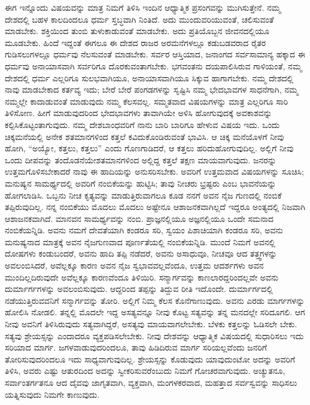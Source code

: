 ಈಗ ಇನ್ನೊಂದು ವಿಷಯವನ್ನು ಮಾತ್ರ ನಿಮಗೆ ತಿಳಿಸಿ ಇಂದಿನ ಆಧ್ಯಾತ್ಮಿಕ ಪ್ರಸಂಗವನ್ನು ಮುಗಿಸುತ್ತೇನೆ. ನಮ್ಮ ದೇಶದಲ್ಲಿ ಬಹಳ ಕಾಲದಿಂದಲೂ ಧರ್ಮ ಸ್ತಬ್ಧವಾಗಿ ನಿಂತಿದೆ. ಅದು ಮುಂದುವರಿಯುವಂತೆ, ಚಲಿಸುವಂತೆ ಮಾಡಬೇಕು. ಶಕ್ತಿಯಿಂದ ತುಂಬಿ ತುಳುಕಾಡುವಂತೆ ಮಾಡಬೇಕು. ಅದು ಪ್ರತಿಯೊಬ್ಬನ ಜೀವನದಲ್ಲಿಯೂ ಮೂಡಬೇಕು. ಹಿಂದೆ ಇದ್ದಂತೆ ಈಗಲೂ ಈ ದೇಶದ ರಾಜರ ಅರಮನೆಗಳಲ್ಲೂ ಕಡುಬಡವರಾದ ರೈತರ ಗುಡಿಸಲುಗಳಲ್ಲೂ ಧರ್ಮವು ನೆಲಸುವಂತೆ ಮಾಡಬೇಕು. ಸರ್ವರ ಆಸ್ತಿಯಾದ, ಜನಾಂಗದ ಸರ್ವಸಾಮಾನ್ಯ ಹಕ್ಕಾದ ಈ ಧರ್ಮವು ಅನಾಯಾಸವಾಗಿ ಸರ್ವರಿಗೂ ದೊರಕುವಂತಾಗಬೇಕು. ಭಗವಂತನು ದಯಪಾಲಿಸಿರುವ ಗಾಳಿಯಂತೆ, ನಮ್ಮ ದೇಶದಲ್ಲಿ ಧರ್ಮ ಎಲ್ಲರಿಗೂ ಸುಲಭವಾಗಿಯೂ, ಅನಾಯಾಸವಾಗಿಯೂ ಸಿಕ್ಕುವ ಹಾಗಾಗಬೇಕು. ನಮ್ಮ ದೇಶದಲ್ಲಿ ನಾವು ಮಾಡಬೇಕಾದ ಕರ್ತವ್ಯ ಇದು; ಬೇರೆ ಬೇರೆ ಪಂಗಡಗಳನ್ನು ಸೃಷ್ಟಿಸಿ ನಮ್ಮ ಭೇದಭಾವಗಳ ಸಾಧನೆಗಾಗಿ, ನಮ್ಮ ನಮ್ಮಲ್ಲೇ ಕಾದಾಡುವಂತೆ ಮಾಡುವುದು ನಮ್ಮ ಕೆಲಸವಲ್ಲ. ಸಮ್ಮತವಾದ ವಿಷಯಗಳನ್ನು ಮಾತ್ರ ಎಲ್ಲರಿಗೂ ಸಾರಿ ತಿಳಿಸೋಣ. ಹೀಗೆ ಮಾಡುವುದರಿಂದ ಭೇದಭಾವಗಳು ತಾವಾಗಿಯೇ ಅಳಿಸಿ ಹೋಗುವುದಕ್ಕೆ ಅವಕಾಶವನ್ನು ಕಲ್ಪಿಸಿಕೊಟ್ಟಂತಾಗುವುದು. ನಮ್ಮ ದೇಶಬಾಂಧವರಿಗೆ ನಾನು ಬಾರಿ ಬಾರಿಗೂ ಹೇಳುವ ವಿಷಯ ಇದು. ಒಂದು ಚಿಕ್ಕಮನೆಯಲ್ಲಿ ಅನೇಕ ಶತಮಾನಗಳಿಂದ ಕತ್ತಲೆ ಕವಿದುಕೊಂಡಿರುವಂತೆ ಭಾವಿಸಿ. ಆ ಚಿಕ್ಕ ಮನೆಯೊಳಗೆ ನೀವು ಹೋಗಿ, “ಅಯ್ಯೋ, ಕತ್ತಲು, ಕತ್ತಲು” ಎಂದು ಗೊಣಗಾಡಿದರೆ, ಆ ಕತ್ತಲು ಹರಿದುಹೋಗುವುದಿಲ್ಲ. ಅಲ್ಲಿಗೆ ನೀವು ಒಂದು ದೀಪವನ್ನು ತಂದೊಡನೆಯೇ\break ಶತಮಾನಗಳಿಂದ ಅಲ್ಲಿದ್ದ ಕತ್ತಲೆ ತಕ್ಷಣ ಮಾಯವಾಗುವುದು. ಜನರನ್ನು ಉತ್ತಮಗೊಳಿಸಬೇಕಾದರೆ ನಾವು ಈ ಹಾದಿಯನ್ನು ಅನುಸರಿಸಬೇಕು. ಅವರಿಗೆ ಉತ್ತಮವಾದ ವಿಷಯಗಳನ್ನು ಸೂಚಿಸಿ; ಮನುಷ್ಯನ ಸಾಮರ್ಥ್ಯದಲ್ಲಿ ಅವರಿಗೆ ನಂಬಿಕೆಯನ್ನು ಹುಟ್ಟಿಸಿ; ತಾವು ನೀಚರು ಭ್ರಷ್ಟರು ಎಂಬ ಭಾವನೆಯನ್ನು ಹೋಗಲಾಡಿಸಿ. ಒಬ್ಬನು ನೀಚ ಕೃತ್ಯವನ್ನು ಮಾಡುತ್ತಿರುವಾಗಲೂ ಕೂಡ ನನಗೆ ಅವನ ನೈಜ ಗುಣದಲ್ಲಿ ನಂಬಿಕೆ ತಪ್ಪಿರುವುದಿಲ್ಲ. ನನ್ನ ನಂಬಿಕೆಯು ಮೊದಲು ಮೊದಲು ಅಷ್ಟೇನೂ ಆಶಾಜನಕವಾಗಿಲ್ಲದೆ ಇದ್ದರೂ ಅಂತ್ಯದಲ್ಲಿ ನಿಜವಾಗಿ ಆಶಾಜನಕವಾಗಿದೆ. ಮಾನವನ ಸಾಮರ್ಥ್ಯವನ್ನು ನಂಬಿ. ಪ್ರಾಜ್ಞನಲ್ಲಿಯೂ ಅಜ್ಞನಲ್ಲಿಯೂ ಒಂದೇ ಸಮನಾದ ನಂಬಿಕೆಯನ್ನಿಡಿ. ಅವನು ನಮಗೆ ದೇವತೆಯಾಗಿ ಕಂಡರೂ ಸರಿ, ಸ್ವಯಂ ಪಿಶಾಚಿಯಾಗಿ ಕಂಡರೂ ಸರಿ, ಅವನು ಮನುಷ್ಯನಾದ ಮಾತ್ರಕ್ಕೆ ಅವನ ನೈಜಗುಣವಾದ ಪೂರ್ಣತೆಯಲ್ಲಿ ನಂಬಿಕೆಯನ್ನಿಡಿ. ಮುಂದೆ ನಿಮಗೆ ಅವನಲ್ಲಿ ದೋಷಗಳು ಕಂಡುಬಂದರೆ, ಅವನು ಹಾದಿ ತಪ್ಪಿ ನಡೆದರೆ, ಅವನು ಅಸಾಧುವೂ, ನೀಚವೂ ಆದ ತತ್ತ್ವಗಳನ್ನು ಅವಲಂಬಿಸಿದರೆ, ಅವೆಲ್ಲಕ್ಕೂ ಕಾರಣ ಅವನ ನೈಜ ಸ್ವಭಾವವಲ್ಲವೆಂದೂ, ಉತ್ತಮ ಆದರ್ಶಗಳು ಅವನ ಮುಂದಿಲ್ಲದಿರುವುದೇ ಅವೆಲ್ಲಕ್ಕೂ ಕಾರಣವೆಂದೂ ತಿಳಿಯಿರಿ. ಸನ್ಮಾರ್ಗವನ್ನು ಕಾಣಲಾರದ್ದರಿಂದಲ್ಲವೇ ಅವನು ದುರ್ಮಾರ್ಗಗಳನ್ನು ಅವಲಂಬಿಸುವುದು. ಆದ್ದರಿಂದ ತಪ್ಪನ್ನು ತಿದ್ದುವ ರೀತಿ ಇದೊಂದೇ. ದುರ್ಮಾರ್ಗದಲ್ಲಿ ನಡೆಯುತ್ತಿರುವವನಿಗೆ ಸನ್ಮಾರ್ಗವನ್ನು ತೋರಿ. ಅಲ್ಲಿಗೆ ನಿಮ್ಮ ಕೆಲಸ ಕೊನೆಗಾಣುವುದು. ಅವನು ಎರಡು ಮಾರ್ಗಗಳನ್ನು ಹೋಲಿಸಿ ನೋಡಲಿ. ತನ್ನಲ್ಲಿ ಮೊದಲೇ ಇದ್ದ ಅಸತ್ಯವನ್ನೂ ನೀವು ಕೊಟ್ಟ ಸತ್ಯವನ್ನು ತನ್ನ ಮನದಲ್ಲೇ ಸರಿದೂಗಲಿ. ಆಗ ನೀವು ಅವನಿಗೆ ತಿಳಿಸಿರುವುದು ಸತ್ಯವಾಗಿದ್ದರೆ, ಅಸತ್ಯವು ಮಾಯವಾಗಲೇಬೇಕು. ಬೆಳಕು ಕತ್ತಲನ್ನು ಓಡಿಸಲೇ ಬೇಕು. ಸತ್ಯವು ಶ್ರೇಯಸ್ಸನ್ನು ಎಂದಾದರೂ ವ್ಯಕ್ತಪಡಿಸಲೇಬೇಕು. ನೀವು ದೇಶವನ್ನು ಆಧ್ಯಾತ್ಮಿಕ ವಿಷಯದಲ್ಲಿ ಸುಧಾರಿಸಲು ಇದು ಸರಿಯಾದ ಮಾರ್ಗ. ಜಗಳವಾಡುವುದರಿಂದಲೂ, ತಾವು ಹಿಡಿದಿರುವ ಮಾರ್ಗ ಸರಿಯಲ್ಲವೆಂದು ಜನರಿಗೆ ತೋರಿಸುವುದರಿಂದಲೂ ಇದು ಸಾಧ್ಯವಾಗುವುದಿಲ್ಲ. ಶ್ರೇಯಸ್ಸನ್ನು ಕೊಡುವುದು ಯಾವುದುಂಟೋ ಅದನ್ನು ಅವರಿಗೆ ತಿಳಿಸಿ, ಅವರು ಎಷ್ಟು ಆತುರದಿಂದ ಅದನ್ನು ಸ್ವೀಕರಿಸುವರೆಂಬುದು ನಿಮಗೆ ಗೋಚರವಾಗುವುದು. ಅಚ್ಯುತನೂ, ಸರ್ವಾಂತರ್ಗತನೂ ಆದ ದೈವವು ಜಾಗೃತವಾಗಿ, ವ್ಯಕ್ತವಾಗಿ, ಮಂಗಳಕರವಾದ, ಮಹತ್ತಾದ ಸರ್ವಸ್ವವನ್ನು ಸಾಧಿಸಲು ಯತ್ನಿಸುವುದು ನಿಮಗೇ ಕಾಣುವುದು. 

